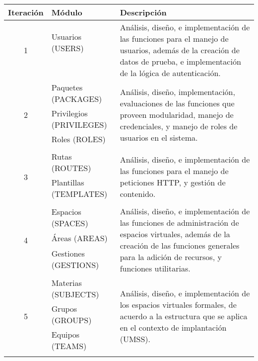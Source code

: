 \begin{table}
\centering
\begin{tabular}{|c|l|p{8.0cm}|}
\hline
Iteración & Módulo & Descripción \\
\hline

\multirow{4}{*}{1} &
Usuarios (USERS) &
\multirow{4}{8cm}{Análisis, diseño, e implementación de las funciones para el
manejo de usuarios, además de la creación de datos de prueba, e implementación
de la lógica de autenticación.} \\
 &  & \\
 &  & \\
 &  & \\
\hline

\multirow{4}{*}{2} &
Paquetes (PACKAGES) &
\multirow{4}{8cm}{Análisis, diseño, implementación, evaluaciones de las
funciones que proveen modularidad, manejo de credenciales, y manejo de roles de
usuarios en el sistema.} \\
 & Privilegios (PRIVILEGES) & \\
 & Roles (ROLES) & \\
 &  & \\
\hline

\multirow{3}{*}{3} &
Rutas (ROUTES) &
\multirow{3}{8cm}{Análisis, diseño, e implementación de las funciones para el
manejo de peticiones HTTP, y gestión de contenido.} \\
 & Plantillas (TEMPLATES) & \\
 & & \\
\hline

\multirow{4}{*}{4} &
Espacios (SPACES) &
\multirow{4}{8cm}{Análisis, diseño, e implementación de las funciones de
administración de espacios virtuales, además de la creación de las funciones
generales para la adición de recursos, y funciones utilitarias.} \\
 & Áreas (AREAS) & \\
 & Gestiones (GESTIONS) & \\
 & & \\
\hline

\multirow{4}{*}{5} &
Materias (SUBJECTS) &
\multirow{4}{8cm}{Análisis, diseño, e implementación de los espacios virtuales
formales, de acuerdo a la estructura que se aplica en el contexto de
implantación (UMSS).} \\
 & Grupos (GROUPS) & \\
 & Equipos (TEAMS) & \\
 & & \\
\hline


\end{tabular}
\end{table}
